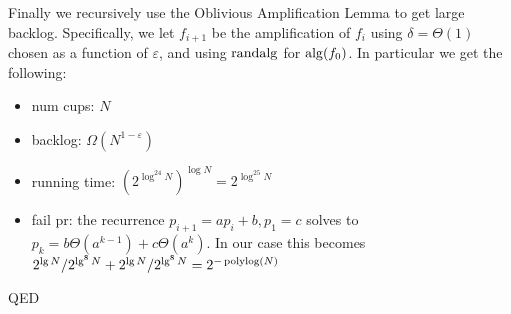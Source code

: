 {Finally we recursively use the Oblivious Amplification Lemma to
get large backlog. Specifically, we let $f_{i+1}$ be the
amplification of $f_i$ using $\delta = \Theta(1)$ chosen as a
function of $\varepsilon$, and using $\operatorname{\text{\textup{randalg}}}$ for $\operatorname{\text{\textup{alg}}}(f_0)$.
In particular we get the following:
\begin{itemize}
  \item num cups: $N$ 
  \item backlog: $\Omega(N^{1-\varepsilon})$
  \item running time: $(2^{\log^{24} N})^{\log N} = 2^{\log^{25} N}$
  \item fail pr: the recurrence $p_{i+1} = ap_i + b, p_1 = c$
    solves to $p_k = b\Theta(a^{k-1}) + c \Theta(a^k)$. In our
    case this becomes $2^{\lg N} / 2^{\lg^8 N} + 2^{\lg
    N}/2^{\lg^8 N} = 2^{-\operatorname{\text{polylog}}(N)}$
\end{itemize}

QED

}

